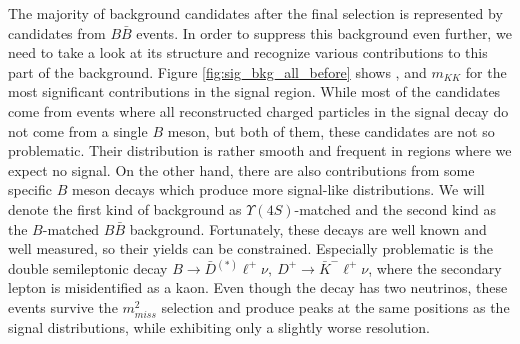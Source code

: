 The majority of background candidates after the final selection is represented by candidates from $B \bar B$ events. In order to suppress this background even further, we need to take a look at its structure and recognize various contributions to this part of the background. Figure \ref{fig:sig_bkg_all_before} shows \vars, and $m_{KK}$ for the most significant contributions in the signal region. While most of the candidates come from events where all reconstructed charged particles in the signal decay do not come from a single $B$ meson, but both of them, these candidates are not so problematic. Their distribution is rather smooth and frequent in regions where we expect no signal. On the other hand, there are also contributions from some specific $B$ meson decays which produce more signal-like distributions. We will denote the first kind of background as $\Upsilon(4S)$-matched and the second kind as the $B$-matched $B \bar B$ background. Fortunately, these decays are well known and well measured, so their yields can be constrained. Especially problematic is the double semileptonic decay $B \to \bar D {}^{(*)} \ell^+ \nu,~D^+ \to \bar K^- \ell^+ \nu$, where the secondary lepton is misidentified as a kaon. Even though the decay has two neutrinos, these events survive the $m_{miss}^2$ selection and produce peaks at the same positions as the signal distributions, while exhibiting only a slightly worse resolution. 

